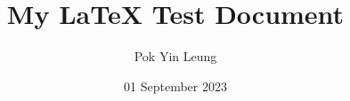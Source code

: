 

\title{My LaTeX Test Document}
\author{Pok Yin Leung}
\date{01 September 2023}




\renewcommand{\labelitemi}{\raisebox{.10ex}{\large$\bullet$}}
\renewcommand{\labelitemii}{{\raisebox{.40ex}{\rule{.6ex}{.6ex}}}}
\renewcommand{\labelitemiii}{{\large$\triangleright$}}

\maketitle








% 
% 
% 
% 
% 


\printbibliography


